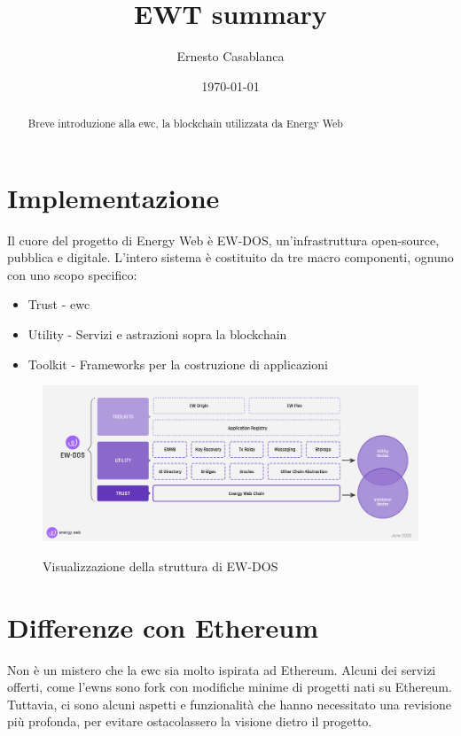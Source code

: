 \documentclass[12pt, letterpaper, twoside]{article}
\title{EWT summary}
\author{Ernesto Casablanca}
\date{\today}
\begin{document}

\tableofcontents

\newpage

\begin{abstract}
    Breve introduzione alla \gls{ewc}, la blockchain utilizzata da Energy Web
\end{abstract}

\section{Implementazione}
Il cuore del progetto di Energy Web è EW-DOS, un'infrastruttura open-source, pubblica e digitale.
L'intero sistema è costituito da tre macro componenti, ognuno con uno scopo specifico:

\begin{itemize}
    \item Trust - \gls{ewc}
    \item Utility - Servizi e astrazioni sopra la blockchain
    \item Toolkit - Frameworks per la costruzione di applicazioni
\end{itemize}

\begin{figure}[h]
    \includegraphics[width=13cm]{ew-dos.png}
    \centering
    \label{ew-dos}
    \caption{Visualizzazione della struttura di EW-DOS \cite{img:ew-dos}}
\end{figure}

\newpage

\section{Differenze con Ethereum}
Non è un mistero che la \gls{ewc} sia molto ispirata ad Ethereum.
Alcuni dei servizi offerti, come l'\gls{ewns} sono fork con modifiche minime di progetti nati su Ethereum. \\
Tuttavia, ci sono alcuni aspetti e funzionalità che hanno necessitato una revisione più profonda, per evitare ostacolassero la visione dietro il progetto. \\
\end{document}
